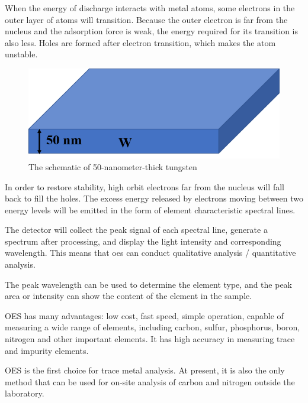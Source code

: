 \documentclass{apmcmthesis}
\begin{document}
\begin{itemize}
\qquad When the energy of discharge interacts with metal atoms, some electrons in the outer layer of atoms will transition. Because the outer electron is far from the nucleus and the adsorption force is weak, the energy required for its transition is also less. Holes are formed after electron transition, which makes the atom unstable.\par

\begin{figure}[ht]
\centering
\includegraphics[scale=0.5]{figures/4.png}
\caption{The schematic of 50-nanometer-thick tungsten}
\label{fig:pathdemo}
\end{figure}


\qquad In order to restore stability, high orbit electrons far from the nucleus will fall back to fill the holes. The excess energy released by electrons moving between two energy levels will be emitted in the form of element characteristic spectral lines.\par

\qquad The detector will collect the peak signal of each spectral line, generate a spectrum after processing, and display the light intensity and corresponding wavelength. This means that oes can conduct qualitative analysis / quantitative analysis.\par

\qquad The peak wavelength can be used to determine the element type, and the peak area or intensity can show the content of the element in the sample.\par

\qquad OES has many advantages: low cost, fast speed, simple operation, capable of measuring a wide range of elements, including carbon, sulfur, phosphorus, boron, nitrogen and other important elements. It has high accuracy in measuring trace and impurity elements.\par

\qquad OES is the first choice for trace metal analysis. At present, it is also the only method that can be used for on-site analysis of carbon and nitrogen outside the laboratory.\par


\end{itemize}
\end{document}
